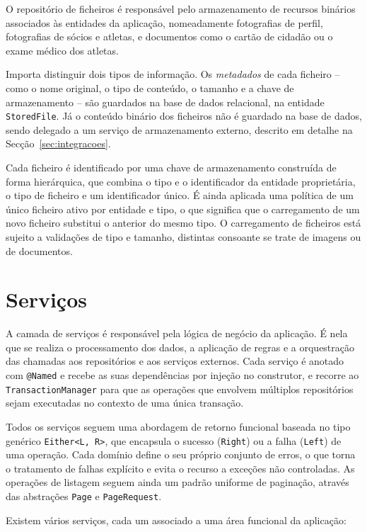O repositório de ficheiros é responsável pelo armazenamento de recursos 
binários associados às entidades da aplicação, nomeadamente fotografias de 
perfil, fotografias de sócios e atletas, e documentos como o cartão de cidadão 
ou o exame médico dos atletas.

Importa distinguir dois tipos de informação. Os \textit{metadados} de cada 
ficheiro -- como o nome original, o tipo de conteúdo, o tamanho e a chave de 
armazenamento -- são guardados na base de dados relacional, na entidade 
\texttt{StoredFile}. Já o conteúdo binário dos ficheiros não é guardado na base 
de dados, sendo delegado a um serviço de armazenamento externo, descrito em 
detalhe na Secção~\ref{sec:integracoes}.

Cada ficheiro é identificado por uma chave de armazenamento construída de forma 
hierárquica, que combina o tipo e o identificador da entidade proprietária, o 
tipo de ficheiro e um identificador único. É ainda aplicada uma política de um 
único ficheiro ativo por entidade e tipo, o que significa que o carregamento de 
um novo ficheiro substitui o anterior do mesmo tipo. O carregamento de 
ficheiros está sujeito a validações de tipo e tamanho, distintas consoante se 
trate de imagens ou de documentos.


\section{Serviços}

A camada de serviços é responsável pela lógica de negócio da aplicação. É nela 
que se realiza o processamento dos dados, a aplicação de regras e a 
orquestração das chamadas aos repositórios e aos serviços externos. Cada 
serviço é anotado com \texttt{@Named} e recebe as suas dependências por 
injeção no construtor, e recorre ao \texttt{TransactionManager} para que as 
operações que envolvem múltiplos repositórios sejam executadas no contexto de 
uma única transação.

Todos os serviços seguem uma abordagem de retorno funcional baseada no tipo 
genérico \texttt{Either<L, R>}, que encapsula o sucesso (\texttt{Right}) ou a 
falha (\texttt{Left}) de uma operação. Cada domínio define o seu próprio 
conjunto de erros, o que torna o tratamento de falhas explícito e evita o 
recurso a exceções não controladas. As operações de listagem seguem ainda um 
padrão uniforme de paginação, através das abstrações \texttt{Page} e 
\texttt{PageRequest}.

Existem vários serviços, cada um associado a uma área funcional da aplicação:

